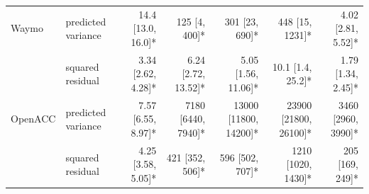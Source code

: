 \begin{table}[htbp]
\begin{tabular}{llrrrrr}
\midrule
Waymo & predicted variance & 14.4 [13.0, 16.0]* & 125 [4, 400]* & 301 [23, 690]* & 448 [15, 1231]* & 4.02 [2.81, 5.52]* \\
 & squared residual & 3.34 [2.62, 4.28]* & 6.24 [2.72, 13.52]* & 5.05 [1.56, 11.06]* & 10.1 [1.4, 25.2]* & 1.79 [1.34, 2.45]* \\
\midrule
OpenACC & predicted variance & 7.57 [6.55, 8.97]* & 7180 [6440, 7940]* & 13000 [11800, 14200]* & 23900 [21800, 26100]* & 3460 [2960, 3990]* \\
 & squared residual & 4.25 [3.58, 5.05]* & 421 [352, 506]* & 596 [502, 707]* & 1210 [1020, 1430]* & 205 [169, 249]* \\
\bottomrule
\end{tabular}
\end{table}
